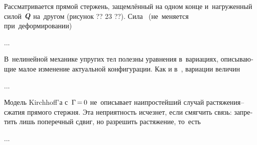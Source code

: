 

\begin{otherlanguage}{russian}

Рассматривается прямой стержень, защемлённый на одном конце и~нагруженный силой~$\mathboldQ$ на~другом (рисунок ?? 23 ??). Сила ~(не~меняется при~деформировании)

...



\end{otherlanguage}



\begin{otherlanguage}{russian}

В~нелинейной механике упругих тел полезны уравнения в~вариациях, описывающие малое изменение актуальной конфигурации. Как и в~, вариации величин

...



\end{otherlanguage}



\begin{otherlanguage}{russian}

Модель Kirchhoff’а с~${\Gamma \hspace{-0.25ex}=\hspace{-0.2ex} 0}$ не~описывает наипростейший случай растяжения\hbox{--}сжатия прямого стержня. Эта неприятность исчезнет, если смягчить связь: запретить лишь поперечный сдвиг, но разрешить растяжение, то~есть

...



\end{otherlanguage}

